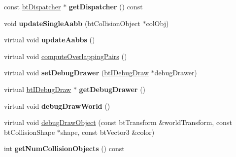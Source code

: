 \begin{DoxyCompactItemize}
\item 
\hypertarget{classbt_collision_world_ae06c3b45a625a99d7707bc244001b5f0}{const \hyperlink{classbt_dispatcher}{bt\+Dispatcher} $\ast$ {\bfseries get\+Dispatcher} () const }\label{classbt_collision_world_ae06c3b45a625a99d7707bc244001b5f0}

\item 
\hypertarget{classbt_collision_world_a47cc9f4005a5de0c0aff85637943a495}{void {\bfseries update\+Single\+Aabb} (bt\+Collision\+Object $\ast$col\+Obj)}\label{classbt_collision_world_a47cc9f4005a5de0c0aff85637943a495}

\item 
\hypertarget{classbt_collision_world_a022960475a5721bcc94145cf84fdcb0f}{virtual void {\bfseries update\+Aabbs} ()}\label{classbt_collision_world_a022960475a5721bcc94145cf84fdcb0f}

\item 
virtual void \hyperlink{classbt_collision_world_afb32fb7ecb40aa6247fd3df18ba81098}{compute\+Overlapping\+Pairs} ()
\item 
\hypertarget{classbt_collision_world_a5a36450fa77f61d62952d3625cf54287}{virtual void {\bfseries set\+Debug\+Drawer} (\hyperlink{classbt_i_debug_draw}{bt\+I\+Debug\+Draw} $\ast$debug\+Drawer)}\label{classbt_collision_world_a5a36450fa77f61d62952d3625cf54287}

\item 
\hypertarget{classbt_collision_world_a68669563c969bedaab6b1a1a073b1507}{virtual \hyperlink{classbt_i_debug_draw}{bt\+I\+Debug\+Draw} $\ast$ {\bfseries get\+Debug\+Drawer} ()}\label{classbt_collision_world_a68669563c969bedaab6b1a1a073b1507}

\item 
\hypertarget{classbt_collision_world_a17103cf11c455d6294ca022f046a412b}{virtual void {\bfseries debug\+Draw\+World} ()}\label{classbt_collision_world_a17103cf11c455d6294ca022f046a412b}

\item 
virtual void \hyperlink{classbt_collision_world_ac1ca6489c220005798069152c3df0d08}{debug\+Draw\+Object} (const bt\+Transform \&world\+Transform, const bt\+Collision\+Shape $\ast$shape, const bt\+Vector3 \&color)
\item 
\hypertarget{classbt_collision_world_a6b8d7354f8c3bd090a64ebdd45f9ad3b}{int {\bfseries get\+Num\+Collision\+Objects} () const }\label{classbt_collision_world_a6b8d7354f8c3bd090a64ebdd45f9ad3b}


\end{DoxyCompactItemize}
